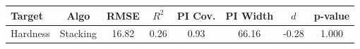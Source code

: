 \begin{tabular}{lccccccc}
\toprule
Target & Algo & RMSE & $R^2$ & PI Cov. & PI Width & $d$ & p-value \\
\midrule
Hardness & Stacking & 16.82 & 0.26 & 0.93 & 66.16 & -0.28 & 1.000 \\
\bottomrule
\end{tabular}
